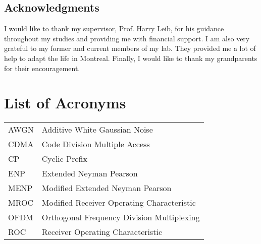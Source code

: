 \documentclass [12pt,letterpaper]{report}
\begin{document}
\section*{\centering Acknowledgments}

I would like to thank my supervisor, Prof. Harry Leib, for his guidance throughout my studies and providing me with financial support. I am also very grateful to my former and current members of my lab. They provided me a lot of help to adapt the life in Montreal. Finally,  I would like to thank my grandparents for their encouragement. 
\tableofcontents
\listoffigures
\listoftables

\newpage
\chapter*{List of Acronyms}

\begin{longtable}{ll}
  AWGN    &   Additive White Gaussian Noise\\
  CDMA    &   Code Division Multiple Access\\
  CP      &   Cyclic Prefix\\
  ENP     &   Extended Neyman Pearson\\
  MENP    &   Modified Extended Neyman Pearson\\
  MROC    &   Modified Receiver Operating Characteristic\\
  OFDM    &   Orthogonal Frequency Division Multiplexing\\
  ROC     &   Receiver Operating Characteristic
\end{longtable}

\cleardoublepage
{}

\typeout{}


\typeout{}


\typeout{}


\typeout{}


\typeout{}


\appendix

\typeout{}


\typeout{}
\begin{singlespace}
  
  
\end{singlespace}
\end{document}
